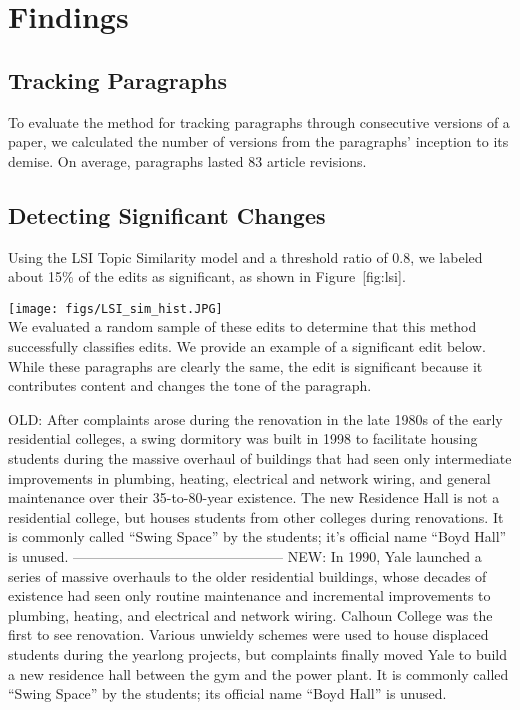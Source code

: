 \section{Findings}\label{findings}

\subsection{Tracking Paragraphs}\label{tracking-paragraphs-1}

To evaluate the method for tracking paragraphs through consecutive
versions of a paper, we calculated the number of versions from the
paragraphs' inception to its demise. On average, paragraphs lasted 83
article revisions.

\subsection{Detecting Significant
Changes}\label{detecting-significant-changes}

Using the LSI Topic Similarity model and a threshold ratio of 0.8, we
labeled about 15\% of the edits as significant, as shown in
Figure~{[}fig:lsi{]}.

\texttt{[image: figs/LSI\_sim\_hist.JPG]}\\

We evaluated a random sample of these edits to determine that this
method successfully classifies edits. We provide an example of a
significant edit below. While these paragraphs are clearly the same, the
edit is significant because it contributes content and changes the tone
of the paragraph.

OLD: After complaints arose during the renovation in the late 1980s of
the early residential colleges, a swing dormitory was built in 1998 to
facilitate housing students during the massive overhaul of buildings
that had seen only intermediate improvements in plumbing, heating,
electrical and network wiring, and general maintenance over their
35-to-80-year existence. The new Residence Hall is not a residential
college, but houses students from other colleges during renovations. It
is commonly called ``Swing Space'' by the students; it's official name
``Boyd Hall'' is unused. ---------------------------------------------
NEW: In 1990, Yale launched a series of massive overhauls to the older
residential buildings, whose decades of existence had seen only routine
maintenance and incremental improvements to plumbing, heating, and
electrical and network wiring. Calhoun College was the first to see
renovation. Various unwieldy schemes were used to house displaced
students during the yearlong projects, but complaints finally moved Yale
to build a new residence hall between the gym and the power plant. It is
commonly called ``Swing Space'' by the students; its official name
``Boyd Hall'' is unused.

